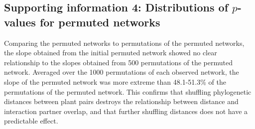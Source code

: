 \documentclass[12pt]{article}
\begin{document}
\begin{spacing}{1.5}
\clearpage

\section*{Supporting information 4: Distributions of $p$-values for permuted networks}


    Comparing the permuted networks to permutations of the permuted networks, the slope obtained from the initial permuted network showed no clear relationship to the slopes obtained from 500 permutations of the permuted network. Averaged over the 1000 permutations of each observed network, the slope of the permuted network was more extreme than 48.1-51.3\% of the permutations of the permuted network. This confirms that shuffling phylogenetic distances between plant pairs destroys the relationship between distance and interaction partner overlap, and that further shuffling distances does not have a predictable effect.



\end{spacing}
\end{document}
